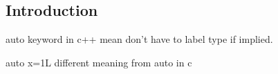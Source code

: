 
\subsection{Introduction}


auto keyword in c++ mean don't have to label type if implied.

auto x=1L
different meaning from auto in c
